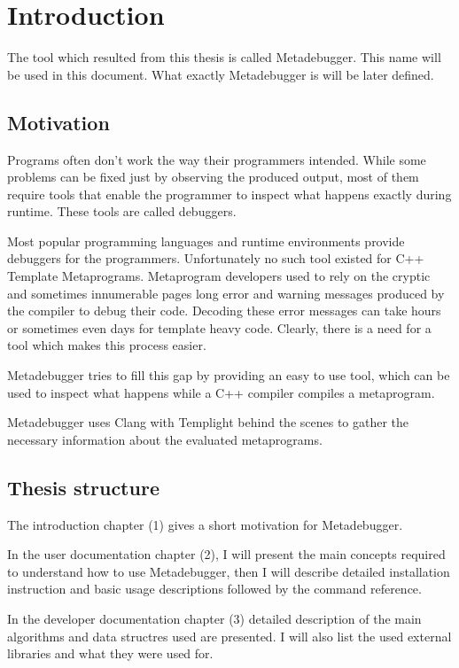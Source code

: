 
\chapter{Introduction}

The tool which resulted from this thesis is called Metadebugger. This name will
be used in this document. What exactly Metadebugger is will be later defined.

\section{Motivation}

Programs often don't work the way their programmers intended. While some
problems can be fixed just by observing the produced output, most of them
require tools that enable the programmer to inspect what happens exactly
during runtime. These tools are called debuggers.

Most popular programming languages and runtime environments provide debuggers
for the programmers. Unfortunately no such tool existed for C++ Template
Metaprograms. Metaprogram developers used to rely on the cryptic and sometimes
innumerable pages long error and warning messages produced by the compiler to
debug their code. Decoding these error messages can take hours or sometimes
even days for template heavy code.\cite{sinkovics-phd}\cite{boost-spirit}
Clearly, there is a need for a tool which makes this process easier.

Metadebugger tries to fill this gap by providing an easy to use tool, which can
be used to inspect what happens while a C++ compiler compiles a metaprogram.

Metadebugger uses Clang with Templight behind the scenes to gather the
necessary information about the evaluated metaprograms.

\section{Thesis structure}

The introduction chapter (1) gives a short motivation for Metadebugger.

In the user documentation chapter (2), I will present the main concepts
required to understand how to use Metadebugger, then I will describe detailed
installation instruction and basic usage descriptions followed by the command
reference.

In the developer documentation chapter (3) detailed description of the main
algorithms and data structres used are presented. I will also list the used
external libraries and what they were used for.

